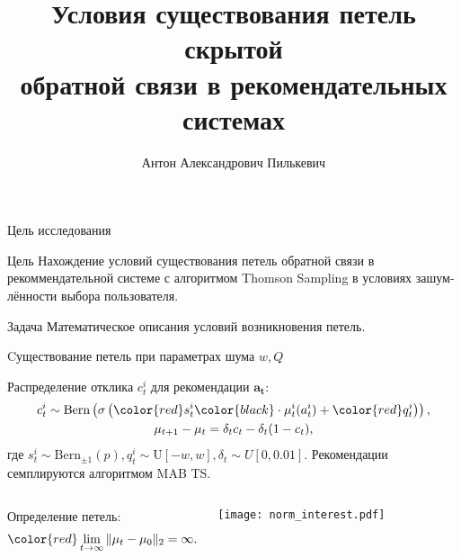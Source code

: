 \documentclass{beamer}
\title[\hbox to 56mm{Петли скрытой обратной связи}]{ Условия существования петель скрытой \\ обратной связи в рекомендательных системах }
\author[А.\,А. Пилькевич]{Антон Александрович Пилькевич}
\institute{Московский физико-технический институт}
\date{\footnotesize
\par\smallskip\emph{Курс:} Автоматизация научных исследований\par (практика, В.\,В.~Стрижов)/Группа 813
\par\smallskip\emph{Эксперт:} А.\,С.~Хританков
\par\smallskip\emph{Консультант:} А.\,С.~Хританков
\par\bigskip\small 2021}
\begin{document}
\begin{frame}
\thispagestyle{empty}
\maketitle
\end{frame}
\begin{frame}{Цель исследования}
\begin{block}{Цель}
  Нахождение условий существования петель обратной
связи в рекоммендательной системе с алгоритмом Thomson Sampling в условиях зашум-
лённости выбора пользователя.
\end{block}
\begin{block}{Задача}
  Математическое описания условий возникновения петель. 
\end{block}
\end{frame}
\begin{frame}{Cуществование петель при параметрах шума $w, Q$}

Распределение отклика $c_t^i$ для рекомендации $\mathbf{a_t}$:
\begin{gather*}
    c_t^i \sim \text{Bern} \left(\sigma\left( \color{red} s_t^i \color{black} \cdot \mu_t^i (a_t^i) + \mathbin{\color{red} q_t^i } \right) \right), \\ 
    \mu_{t+1} - \mu_{t} = \delta_t c_t - \delta_t (1 - c_t), 
\end{gather*}
где $s_t^i \sim \text{Bern}_{\pm 1}(p), q_t^i \sim \text{U}[-w, w], \delta_t \sim U[0, 0.01].$
Рекомендации семплируются алгоритмом MAB TS.

\begin{columns}[c]
Определение петель: 
\begin{gather*}
  \color{red} \lim_{t \to \infty} \|\mu_t - \mu_0 \|_2 = \infty.
\end{gather*}
\begin{center}
  \texttt{[image: norm\_interest.pdf]}
\end{center}
\end{columns}
\end{frame}
\end{document}
